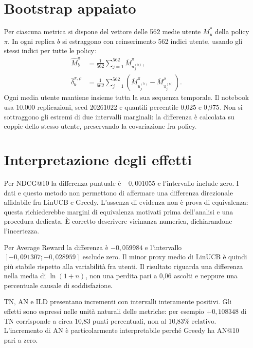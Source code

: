 \section{Bootstrap appaiato}
Per ciascuna metrica si dispone del vettore delle 562 medie utente $\overline M^\pi_u$ della policy $\pi$. In ogni replica $b$ si estraggono con reinserimento 562 indici utente, usando gli stessi indici per tutte le policy:
\begin{align}
\widehat M_b^\pi&=\frac1{562}\sum_{j=1}^{562}\overline M^\pi_{u_j^{(b)}},\\
\widehat\delta_b^{\pi,\rho}
&=\frac1{562}\sum_{j=1}^{562}
\left(\overline M^\pi_{u_j^{(b)}}-\overline M^\rho_{u_j^{(b)}}\right).
\end{align}
Ogni media utente mantiene insieme tutta la sua sequenza temporale. Il notebook usa 10.000 replicazioni, seed 20261022 e quantili percentile 0,025 e 0,975. Non si sottraggono gli estremi di due intervalli marginali: la differenza è calcolata su coppie dello stesso utente, preservando la covariazione fra policy.

\begin{table}[htbp]\centering\small

\caption{LinUCB $\alpha=2$ meno Personalized Greedy nel test: differenze appaiate e IC bootstrap al 95\% (percentile), dagli output verificati del notebook statistico.}\label{tab:ci}
\end{table}

\section{Interpretazione degli effetti}
Per NDCG@10 la differenza puntuale è $-0{,}001055$ e l'intervallo include zero. I dati e questo metodo non permettono di affermare una differenza direzionale affidabile fra LinUCB e Greedy. L'assenza di evidenza non è prova di equivalenza: questa richiederebbe margini di equivalenza motivati prima dell'analisi e una procedura dedicata. È corretto descrivere vicinanza numerica, dichiarandone l'incertezza.

Per Average Reward la differenza è $-0{,}059984$ e l'intervallo $[-0{,}091307;-0{,}028959]$ esclude zero. Il minor proxy medio di LinUCB è quindi più stabile rispetto alla variabilità fra utenti. Il risultato riguarda una differenza nella media di $\ln(1+n)$, non una perdita pari a 0,06 ascolti e neppure una percentuale causale di soddisfazione.

TN, AN e ILD presentano incrementi con intervalli interamente positivi. Gli effetti sono espressi nelle unità naturali delle metriche: per esempio $+0{,}108348$ di TN corrisponde a circa 10,83 punti percentuali, non al 10,83\% relativo. L'incremento di AN è particolarmente interpretabile perché Greedy ha AN@10 pari a zero.

